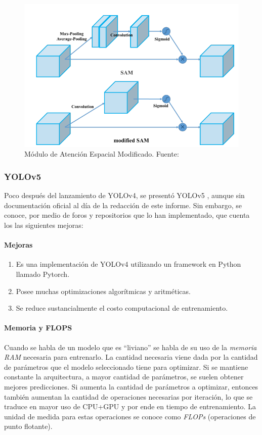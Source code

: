     \begin{figure}[h!]
        \centering
        \includegraphics[width=1\textwidth]{img/modifedsam.png}
        \caption{Módulo de Atención Espacial Modificado. Fuente: \cite{yolov4}}
        \label{fig:sam}
    \end{figure}

\subsubsection{YOLOv5}

Poco después del lanzamiento de YOLOv4, se presentó YOLOv5 \cite{yolov5}, aunque sin documentación oficial al día de la redacción de este informe. Sin embargo, se conoce, por medio de foros y repositorios que lo han implementado, que cuenta los las siguientes mejoras:
\paragraph{Mejoras}
     \begin{enumerate}
		\item Es una implementación de YOLOv4 utilizando un framework en Python llamado Pytorch.
		\item Posee muchas optimizaciones algorítmicas y aritméticas.
        \item Se reduce sustancialmente el costo computacional de entrenamiento.
     \end{enumerate}

\paragraph{Memoria y FLOPS}
Cuando se habla de un modelo que es “liviano” se habla de su uso de la \textit{memoria RAM} necesaria para entrenarlo.
La cantidad necesaria viene dada por la cantidad de parámetros que el modelo seleccionado tiene para optimizar.
Si se mantiene constante la arquitectura, a mayor cantidad de parámetros, se suelen obtener mejores predicciones.
Si aumenta la cantidad de parámetros a optimizar, entonces también aumentan la cantidad de operaciones necesarias por iteración, lo que se traduce en mayor uso de CPU+GPU y por ende en tiempo de entrenamiento.
La unidad de medida para estas operaciones se conoce como \textit{FLOPs} (operaciones de punto flotante).\\
\hfill \break

